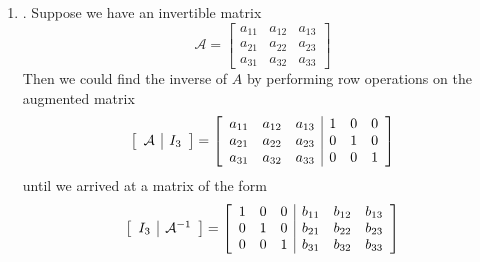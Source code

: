 \documentclass[12pt]{article}
\begin{document}
\begin{enumerate}
	\begin{enumerate}
			\item\underline{}.
		Suppose we have an invertible matrix
		\[\mathcal{A}=\begin{bmatrix}a_{11} & a_{12} & a_{13} \\ a_{21} & a_{22} & a_{23} \\ a_{31} & a_{32} & a_{33}\end{bmatrix}\]
		Then we could find the inverse of $A$ by performing row operations on the augmented matrix
		\[\left[\begin{array}{c |c} \mathcal{A} & I_3\end{array}\right]
		=\left[\begin{array}{c c c | c c c}
		a_{11}	&a_{12}	&a_{13}	&1	&0	&0	\\
		a_{21}	&a_{22}	&a_{23}	&0	&1	&0	\\
		a_{31}	&a_{32}	&a_{33}	&0	&0	&1
		\end{array}\right]\]
		until we arrived at a matrix of the form
		\[\left[\begin{array}{c|c}I_3 & \mathcal{A}^{-1}\end{array}\right]
		=\left[\begin{array}{c c c | c c c}
		1	&0	&0	&b_{11}	&b_{12}	&b_{13} \\
		0	&1	&0	&b_{21}	&b_{22}	&b_{23} \\
		0	&0	&1	&b_{31}	&b_{32}	&b_{33}
		\end{array}\right]\]
		
		
		

\end{enumerate}
\end{enumerate}
\end{document}
